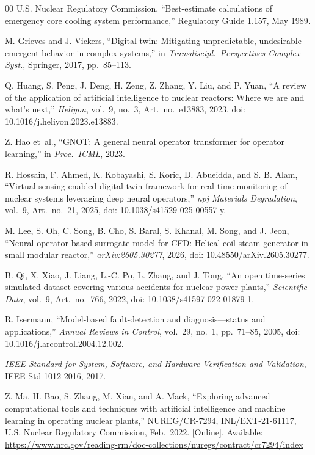 \documentclass[journal]{IEEEtran}
\newcommand{\added}[1]{#1}
\begin{document}
\begin{thebibliography}{00}
\added{U.S. Nuclear Regulatory Commission,
``Best-estimate calculations of emergency core cooling system performance,''
Regulatory Guide 1.157, May 1989.}

M. Grieves and J. Vickers,
``Digital twin: Mitigating unpredictable, undesirable emergent behavior in complex systems,''
in \textit{Transdiscipl.\ Perspectives Complex Syst.}, Springer, 2017, pp.~85--113.

\added{Q. Huang, S. Peng, J. Deng, H. Zeng, Z. Zhang, Y. Liu, and P. Yuan,
``A review of the application of artificial intelligence to nuclear reactors: Where we are and what's next,''
\textit{Heliyon}, vol.~9, no.~3, Art.~no.~e13883, 2023, doi: 10.1016/j.heliyon.2023.e13883.}

Z. Hao et~al.,
``GNOT: A general neural operator transformer for operator learning,''
in \textit{Proc.\ ICML}, 2023.

\added{R. Hossain, F. Ahmed, K. Kobayashi, S. Koric, D. Abueidda, and S. B. Alam,
``Virtual sensing-enabled digital twin framework for real-time monitoring of nuclear systems leveraging deep neural operators,''
\textit{npj Materials Degradation}, vol.~9, Art.~no.~21, 2025, doi: 10.1038/s41529-025-00557-y.}

\added{M. Lee, S. Oh, C. Song, B. Cho, S. Baral, S. Khanal, M. Song, and J. Jeon,
``Neural operator-based surrogate model for CFD: Helical coil steam generator in small modular reactor,''
\textit{arXiv:2605.30277}, 2026, doi: 10.48550/arXiv.2605.30277.}

\added{B. Qi, X. Xiao, J. Liang, L.-C. Po, L. Zhang, and J. Tong,
``An open time-series simulated dataset covering various accidents for nuclear power plants,''
\textit{Scientific Data}, vol.~9, Art.~no.~766, 2022, doi: 10.1038/s41597-022-01879-1.}

\added{R. Isermann,
``Model-based fault-detection and diagnosis---status and applications,''
\textit{Annual Reviews in Control}, vol.~29, no.~1, pp.~71--85, 2005, doi: 10.1016/j.arcontrol.2004.12.002.}

\added{\textit{IEEE Standard for System, Software, and Hardware Verification and Validation},
IEEE Std 1012-2016, 2017.}

\added{Z. Ma, H. Bao, S. Zhang, M. Xian, and A. Mack,
``Exploring advanced computational tools and techniques with artificial intelligence and machine learning in operating nuclear plants,''
NUREG/CR-7294, INL/EXT-21-61117, U.S. Nuclear Regulatory Commission, Feb.~2022. [Online]. Available: \url{https://www.nrc.gov/reading-rm/doc-collections/nuregs/contract/cr7294/index}}


\end{thebibliography}
\end{document}
